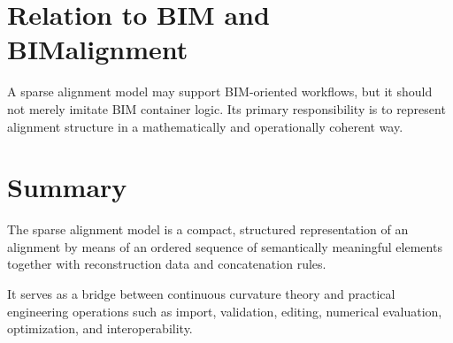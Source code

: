 \section{Relation to BIM and BIMalignment}

\begin{remark}
A sparse alignment model may support BIM-oriented workflows, but it
should not merely imitate BIM container logic.
Its primary responsibility is to represent alignment structure in a
mathematically and operationally coherent way.
\end{remark}


\section{Summary}

\begin{summary}
The sparse alignment model is a compact, structured representation of an
alignment by means of an ordered sequence of semantically meaningful
elements together with reconstruction data and concatenation rules.

It serves as a bridge between continuous curvature theory and practical
engineering operations such as import, validation, editing, numerical
evaluation, optimization, and interoperability.
\end{summary}
